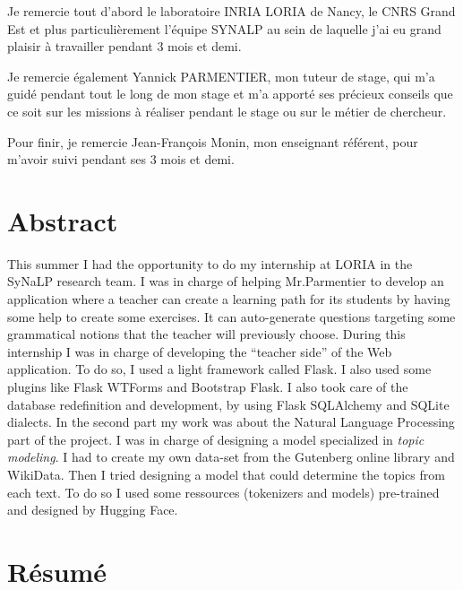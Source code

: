\documentclass[12pt]{article}
\begin{document}
Je remercie tout d'abord le laboratoire INRIA LORIA de Nancy, le CNRS Grand Est et plus particulièrement l'équipe SYNALP au sein de laquelle j'ai eu grand plaisir à travailler pendant 3 mois et demi. 

Je remercie également Yannick PARMENTIER, mon tuteur de stage, qui m’a guidé pendant tout le long de mon stage et m’a apporté ses précieux conseils que ce soit sur les missions à réaliser pendant le stage ou sur le métier de chercheur. 

Pour finir, je remercie Jean-François Monin, mon enseignant référent, pour m’avoir suivi pendant ses 3 mois et demi. 


\newpage

\section*{Abstract}

This summer I had the opportunity to do my internship at LORIA in the SyNaLP research team. I was in charge of helping Mr.Parmentier to develop an application where a teacher can create a learning path for its students by having some help to create some exercises. It can auto-generate questions targeting some grammatical notions that the teacher will previously choose. 
During this internship I was in charge of developing the “teacher side” of the Web application. To do so, I used a light framework called Flask. I also used some plugins like Flask WTForms and Bootstrap Flask. I also took care of the database redefinition and development, by using Flask SQLAlchemy and SQLite dialects.  
In the second part my work was about the Natural Language Processing part of the project. I was in charge of designing a model specialized in \textit{topic modeling}. I had to create my own data-set from the Gutenberg online library and WikiData. Then I tried designing a model that could determine the topics from each text. To do so I used some ressources (tokenizers and models) pre-trained and designed by Hugging Face. 

\section*{Résumé}
\end{document}

